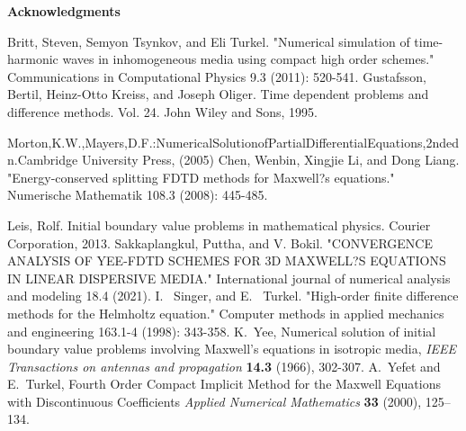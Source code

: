 \documentclass[12pt,reqno]{amsart}
\theoremstyle{definition}
\numberwithin{equation}{section}
\begin{document}
			
			\begin{center}
				{\bf Acknowledgments}
			\end{center}
			\begin{thebibliography}{99}
				
				
				Britt, Steven, Semyon Tsynkov, and Eli Turkel. "Numerical simulation of time-harmonic waves in inhomogeneous media using compact high order schemes." Communications in Computational Physics 9.3 (2011): 520-541.		
Gustafsson, Bertil, Heinz-Otto Kreiss, and Joseph Oliger. Time dependent problems and difference methods. Vol. 24. John Wiley and Sons, 1995.
			
				Morton,K.W.,Mayers,D.F.:NumericalSolutionofPartialDifferentialEquations,2ndedn.Cambridge
				University Press, (2005)
				Chen, Wenbin, Xingjie Li, and Dong Liang. "Energy-conserved splitting FDTD methods for Maxwell?s equations." Numerische Mathematik 108.3 (2008): 445-485.
				
				Leis, Rolf. Initial boundary value problems in mathematical physics. Courier Corporation, 2013.
				Sakkaplangkul, Puttha, and V. Bokil. "CONVERGENCE ANALYSIS OF YEE-FDTD SCHEMES FOR 3D MAXWELL?S EQUATIONS IN LINEAR DISPERSIVE MEDIA." International journal of numerical analysis and modeling 18.4 (2021).	
				I. ~Singer, and E.~ Turkel. "High-order finite difference methods for the Helmholtz equation." Computer methods in applied mechanics and engineering 163.1-4 (1998): 343-358.					
				K.~Yee, Numerical solution of initial boundary value problems involving Maxwell's equations in isotropic media, {\em IEEE Transactions on antennas and propagation} {\bf 14.3} (1966), 302-307.
				A.~Yefet and E.~Turkel,
				Fourth Order Compact Implicit Method for the Maxwell Equations with Discontinuous Coefficients
				{\em Applied Numerical Mathematics}  {\bf 33} (2000), 125--134.
			\end{thebibliography}
		
\end{document}
